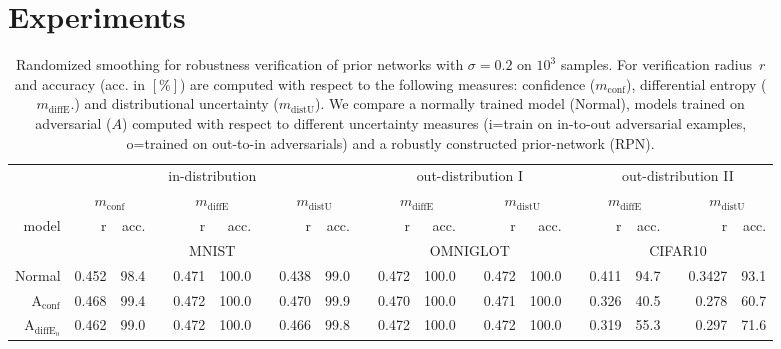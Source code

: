 
\section{Experiments}



\begin{table}[ht]
	\centering
	\caption{Randomized smoothing for robustness verification of prior networks with $\sigma=0.2$ on $10^3$ samples. For verification radius~$r$ and accuracy (acc. in $[\%]$) are computed with respect to the following measures: confidence ($m_{\mathrm{conf}}$), differential entropy ($m_{\mathrm{diffE}}$.) and distributional uncertainty ($m_{\mathrm{distU}}$). We compare a normally trained model (Normal), models trained on adversarial ($A$) computed with respect to different uncertainty measures (i=train on in-to-out adversarial examples, o=trained on out-to-in adversarials) and a robustly constructed prior-network (RPN).}
	\begin{tiny}
		\begin{tabular}{@{}rrrcrrcrrcrrcrrcrrcrr@{}}
			\toprule
			& \multicolumn{8}{c}{in-distribution} &  & \multicolumn{5}{c}{out-distribution I} &   & \multicolumn{5}{c}{out-distribution II} \\
			\cmidrule{2-9} \cmidrule{11-15} \cmidrule{17-21}
			& \multicolumn{2}{c}{$m_{\mathrm{conf}}$} &   & \multicolumn{2}{c}{$m_{\mathrm{diffE}}$} &   & \multicolumn{2}{c}{$m_{\mathrm{distU}}$} &   
			& \multicolumn{2}{c}{$m_{\mathrm{diffE}}$} &   & \multicolumn{2}{c}{$m_{\mathrm{distU}}$} & 
			& \multicolumn{2}{c}{$m_{\mathrm{diffE}}$} &   & \multicolumn{2}{c}{$m_{\mathrm{distU}}$} \\
			\cmidrule{2-3}  \cmidrule{5-6} \cmidrule{8-9} \cmidrule{11-12}  \cmidrule{14-15} \cmidrule{17-18} \cmidrule{20-21}
			model & r & acc. & & r & acc. &  & r & acc. & & r & acc. & & r & acc. & & r & acc. & & r & acc. \\
			\midrule
			& \multicolumn{8}{c}{MNIST} & & \multicolumn{5}{c}{OMNIGLOT} & & \multicolumn{5}{c}{CIFAR10} \\
			Normal                            & 0.452 & 98.4 & & 0.471 & 100.0 & & 0.438 & 99.0 & & 0.472 & 100.0 & & 0.472 & 100.0 & & 0.411 & 94.7 & & 0.3427 & 93.1 \\
			$\mathrm{A}_{\mathrm{conf}}$       & 0.468 & 99.4 & & 0.472 & 100.0 & & 0.470 & 99.9 & & 0.470 & 100.0 & & 0.471 & 100.0 & & 0.326 & 40.5 & & 0.278 & 60.7 \\
			$\mathrm{A}_{\mathrm{diffE_{o}}}$  & 0.462 & 99.0 & & 0.472 & 100.0 & & 0.466 & 99.8 & & 0.472 & 100.0 & & 0.472 & 100.0 & & 0.319 & 55.3 & & 0.297 & 71.6 \\

\end{tabular}
\end{tiny}
\end{table}
